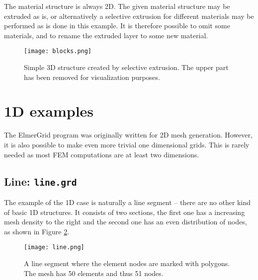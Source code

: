 The material structure is always 2D. 
The given material structure may be 
extruded as is, or alternatively a selective extrusion for
different materials may be performed as is done in this example.
It is therefore possible to omit some materials, and to rename 
the extruded layer to some new material.



\begin{figure}[H]
\centering
\texttt{[image: blocks.png]}
\caption{Simple 3D structure created by selective extrusion. 
	The upper part has been removed for visualization purposes.}
\label{fg:pic11}
\end{figure}


\section{1D examples}

The ElmerGrid program was originally written for 2D mesh generation. 
However, it is also possible to make even more trivial one dimensional grids.
This is rarely needed as most FEM computations are at least two dimensions.

\subsection*{Line: \texttt{line.grd}}

The example of the 1D case is naturally a line segment -- there are no other kind of basic 1D structures.
It consists of two sections, the first one has a increasing mesh density to the right and the second one
has an even distribution of nodes, as shown in Figure \ref{fg:pic12}.


\begin{figure}[H]
\centering
\texttt{[image: line.png]} 
\caption{A line segment where the element nodes are marked with polygons.
The mesh has 50 elements and thus 51 nodes.}
\label{fg:pic12}
\end{figure}
